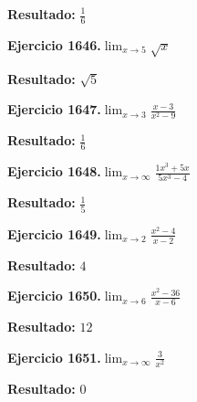 \documentclass[10pt,a4paper]{article}
\begin{document}
\begin{solbox}
\textbf{Resultado:} \(\displaystyle \frac{1}{6}\)
\end{solbox}

\begin{ejbox}
\textbf{Ejercicio 1646.}\quad $\lim_{x\to 5} \sqrt{x}$
\end{ejbox}

\begin{solbox}
\textbf{Resultado:} \(\displaystyle \sqrt{5}\)
\end{solbox}

\begin{ejbox}
\textbf{Ejercicio 1647.}\quad $\lim_{x\to 3} \frac{x-3}{x^2-9}$
\end{ejbox}

\begin{solbox}
\textbf{Resultado:} \(\displaystyle \frac{1}{6}\)
\end{solbox}

\newpage
\begin{ejbox}
\textbf{Ejercicio 1648.}\quad $\lim_{x\to \infty} \frac{1x^3 + 5x}{5x^3 - 4}$
\end{ejbox}

\begin{solbox}
\textbf{Resultado:} \(\displaystyle \frac{1}{5}\)
\end{solbox}

\begin{ejbox}
\textbf{Ejercicio 1649.}\quad $\lim_{x\to 2} \frac{x^2-4}{x-2}$
\end{ejbox}

\begin{solbox}
\textbf{Resultado:} \(\displaystyle 4\)
\end{solbox}

\begin{ejbox}
\textbf{Ejercicio 1650.}\quad $\lim_{x\to 6} \frac{x^2-36}{x-6}$
\end{ejbox}

\begin{solbox}
\textbf{Resultado:} \(\displaystyle 12\)
\end{solbox}

\newpage
\begin{ejbox}
\textbf{Ejercicio 1651.}\quad $\lim_{x\to \infty} \frac{3}{x^2}$
\end{ejbox}

\begin{solbox}
\textbf{Resultado:} \(\displaystyle 0\)
\end{solbox}
\end{document}
